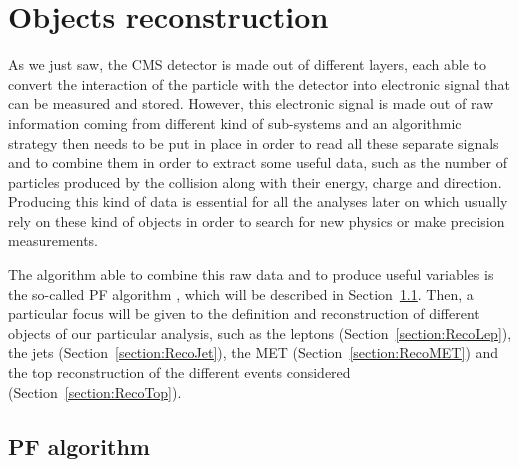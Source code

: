 \documentclass[a4paper, 10pt, openright]{report}
\begin{document}
%

\chapter{Objects reconstruction} \label{chapter:Reco}

As we just saw, the \ac{CMS} detector is made out of different layers, each able to convert the interaction of the particle with the detector into electronic signal that can be measured and stored. However, this electronic signal is made out of raw information coming from different kind of sub-systems and an algorithmic strategy then needs to be put in place in order to read all these separate signals and to combine them in order to extract some useful data, such as the number of particles produced by the collision along with their energy, charge and direction. Producing this kind of data is essential for all the analyses later on which usually rely on these kind of objects in order to search for new physics or make precision measurements. 

The algorithm able to combine this raw data and to produce useful variables is the so-called \acf{PF} algorithm \cite{PF}, which will be described in Section~\ref{section:PF}. Then, a particular focus will be given to the definition and reconstruction of different objects of our particular analysis, such as the leptons (Section~\ref{section:RecoLep}), the jets (Section~\ref{section:RecoJet}), the \acf{MET} (Section~\ref{section:RecoMET}) and the top reconstruction of the different events considered (Section~\ref{section:RecoTop}).

\section{\acf{PF} algorithm} \label{section:PF}
\end{document}
